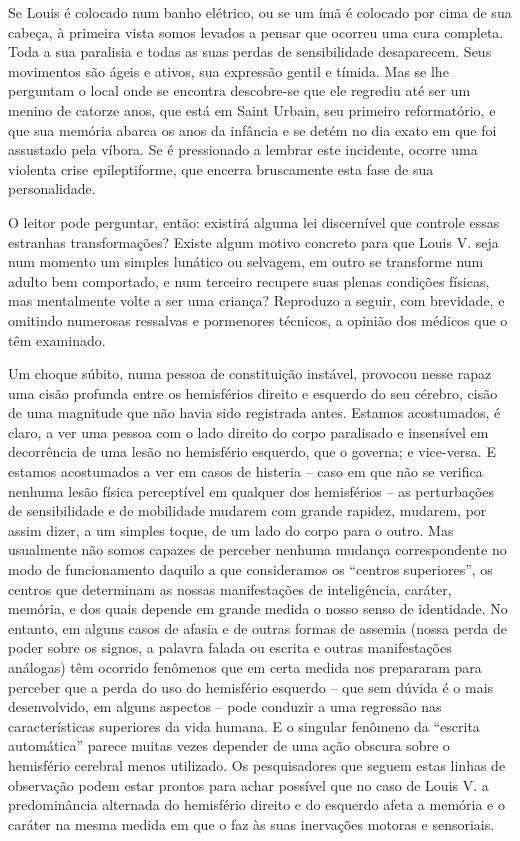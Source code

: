 Se Louis é colocado num banho elétrico, ou se um ímã é colocado por cima
de sua cabeça, à primeira vista somos levados a pensar que ocorreu uma
cura completa.  Toda a sua paralisia e todas as suas perdas de
sensibilidade desaparecem.  Seus movimentos são ágeis e ativos, sua
expressão gentil e tímida.  Mas se lhe perguntam o local onde se
encontra descobre-se que ele regrediu até ser um menino de catorze
anos, que está em Saint Urbain, seu primeiro reformatório, e que sua
memória abarca os anos da infância e se detém no dia exato em que foi
assustado pela víbora. Se é pressionado a lembrar este incidente,
ocorre uma violenta crise epileptiforme, que encerra bruscamente esta
fase de sua personalidade.

O leitor pode perguntar, então: existirá alguma lei discernível que
controle essas estranhas transformações?  Existe algum motivo concreto
para que Louis V. seja num momento um simples lunático ou selvagem, em
outro se transforme num adulto bem comportado, e num terceiro recupere
suas plenas condições físicas, mas mentalmente volte a ser uma criança?
 Reproduzo a seguir, com brevidade, e omitindo numerosas ressalvas e
pormenores técnicos, a opinião dos médicos que o têm examinado.

Um choque súbito, numa pessoa de constituição instável, provocou nesse
rapaz uma cisão profunda entre os hemisférios direito e esquerdo do seu
cérebro, cisão de uma magnitude que não havia sido registrada antes. 
Estamos acostumados, é claro, a ver uma pessoa com o lado direito do
corpo paralisado e insensível em decorrência de uma lesão no hemisfério
esquerdo, que o governa; e vice-versa.  E estamos acostumados a ver em
casos de histeria -- caso em que não se verifica nenhuma lesão física
perceptível em qualquer dos hemisférios -- as perturbações de
sensibilidade e de mobilidade mudarem com grande rapidez, mudarem, por
assim dizer, a um simples toque, de um lado do corpo para o outro.  Mas
usualmente não somos capazes de perceber nenhuma mudança correspondente
no modo de funcionamento daquilo a que consideramos os “centros
superiores”, os centros que determinam as nossas manifestações de
inteligência, caráter, memória, e dos quais depende em grande medida o
nosso senso de identidade.  No entanto, em alguns casos de afasia e de
outras formas de assemia (nossa perda de poder sobre os signos, a
palavra falada ou escrita e outras manifestações análogas) têm ocorrido
fenômenos que em certa medida nos prepararam para perceber que a perda
do uso do hemisfério esquerdo -- que sem dúvida é o mais desenvolvido,
em alguns aspectos -- pode conduzir a uma regressão nas características
superiores da vida humana.  E o singular fenômeno da “escrita
automática” parece muitas vezes depender de uma ação obscura sobre o
hemisfério cerebral menos utilizado.  Os pesquisadores que seguem estas
linhas de observação podem estar prontos para achar possível que no
caso de Louis V. a predominância alternada do hemisfério direito e do
esquerdo afeta a memória e o caráter na mesma medida em que o faz às
suas inervações motoras e sensoriais.  

